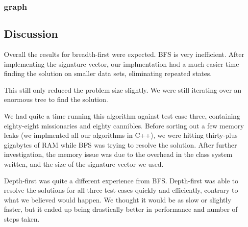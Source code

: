 \documentclass[10pt,letterpaper]{article}
\begin{document}
  \subsubsection{graph}
    \begin{center}
  \end{center}

  \subsection{Discussion}
  Overall the results for breadth-first were expected. BFS is very inefficient.
  After implementing the signature vector, our implmentation had a much easier
  time finding the solution on smaller data sets, eliminating repeated states.

  This still only reduced the problem size slightly. We were still iterating
  over an enormous tree to find the solution.

  We had quite a time running this algorithm against test case three, containing
  eighty-eight missionaries and eighty cannibles. Before sorting out a few memory
  leaks (we implmented all our algorithms in C++), we were hitting thirty-plus
  gigabytes of RAM while BFS was trying to resolve the solution. After further
  investigation, the memory issue was due to the overhead in the class system
  written, and the size of the signature vector we used.

  Depth-first was quite a different experience from BFS. Depth-first was able to
  resolve the solutions for all three test cases quickly and efficiently,
  contrary to what we believed would happen. We thought it would be as slow or
  slightly faster, but it ended up being drastically better in performance and
  number of steps taken.
\end{document}

